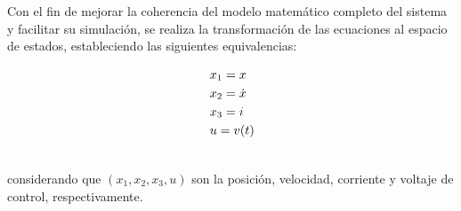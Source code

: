 Con el fin de mejorar la coherencia del modelo matemático completo del sistema y facilitar su simulación, se realiza la transformación de las ecuaciones al espacio de estados, estableciendo las siguientes equivalencias:


\begin{align*}
    &x_{1}=x \\ \thinspace
    &x_{2}=\dot{x} \\ \thinspace
    &x_{3}=i \\ \thinspace
    &u=v(t) \\ \thinspace
\end{align*} 

considerando que $(x_{1},x_{2},x_{3},u)$ son la posición, velocidad, corriente y voltaje de control, respectivamente.



